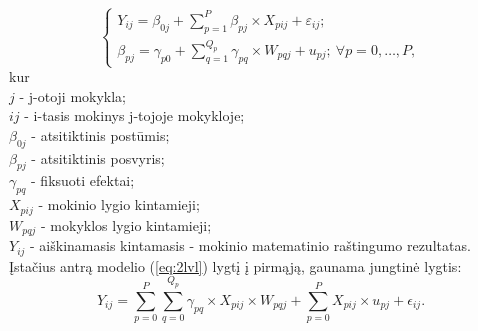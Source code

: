 \documentclass[12pt,a4paper]{article}
\begin{document}
\begin{equation} \label{eq:2lvl}
\left\{
\begin{array}{l}
Y_{ij} = \beta_{0j}+\sum^P_{p = 1} \beta_{pj}\times X_{pij}+\varepsilon_{ij}; \\
\beta_{pj} = \gamma_{p0} + \sum^{Q_p}_{q=1}\gamma_{pq}\times W_{pqj}+u_{pj};\ \forall p = 0 , \dots, P,
\end{array} \right.
\end{equation}
kur\\
$j$ - j-otoji mokykla;\\
$ij$ - i-tasis mokinys j-tojoje mokykloje;\\
$\beta_{0j}$ - atsitiktinis postūmis;\\
$\beta_{pj}$ - atsitiktinis posvyris;\\
$\gamma_{pq}$ - fiksuoti efektai;\\
$X_{pij}$ - mokinio lygio kintamieji;\\
$W_{pqj}$ - mokyklos lygio kintamieji;\\
$Y_{ij}$ - aiškinamasis kintamasis - mokinio matematinio raštingumo rezultatas.\\

\indent Įstačius antrą modelio (\ref{eq:2lvl}) lygtį į pirmąją, gaunama jungtinė lygtis:
\begin{equation} \label{eq:2lvljung}
Y_{ij} =\sum^P_{p = 0} \sum^{Q_p}_{q=0}\gamma_{pq}\times X_{pij}\times W_{pqj}+\sum^P_{p = 0} X_{pij}\times u_{pj}+\epsilon_{ij}.
\end{equation}
\end{document}
